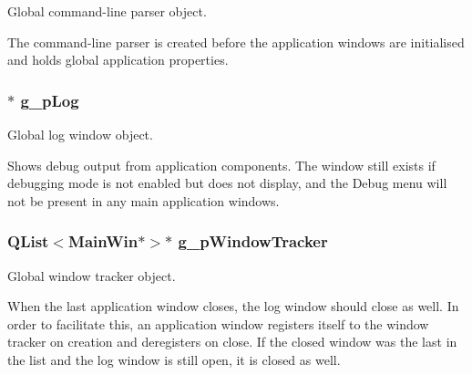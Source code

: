 Global command-\/line parser object. 

The command-\/line parser is created before the application windows are initialised and holds global application properties. \hypertarget{group___global_variables_gae7f290eef5ae2111832362dfb5c84af7}{
\subsubsection[{g\-\_\-p\-Log}]{$\ast$ g\-\_\-p\-Log}}\label{group___global_variables_gae7f290eef5ae2111832362dfb5c84af7}


Global log window object. 

Shows debug output from application components. The window still exists if debugging mode is not enabled but does not display, and the Debug menu will not be present in any main application windows. \hypertarget{group___global_variables_gab5d481b5087f9956e533067ad8001d78}{
\subsubsection[{g\-\_\-p\-Window\-Tracker}]{\setlength{\rightskip}{0pt plus 5cm}Q\-List$<${\bf Main\-Win}$\ast$$>$$\ast$ g\-\_\-p\-Window\-Tracker}}\label{group___global_variables_gab5d481b5087f9956e533067ad8001d78}


Global window tracker object. 

When the last application window closes, the log window should close as well. In order to facilitate this, an application window registers itself to the window tracker on creation and deregisters on close. If the closed window was the last in the list and the log window is still open, it is closed as well. 